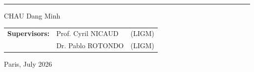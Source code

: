 \begin{titlepage}
\begin{center}
    \vspace{0.5cm}
    \noindent\rule{\textwidth}{0.4pt}

    \vfill
    \Large
    CHAU Dang Minh

    \vfill

    \large
    \begin{tabular}{lll}
      \textbf{Supervisors:}
       & Prof. Cyril NICAUD & (LIGM) \\
       & Dr. Pablo ROTONDO  & (LIGM)
    \end{tabular}


    \vfill

    \large
    Paris, July 2026

  \end{center}
\end{titlepage}